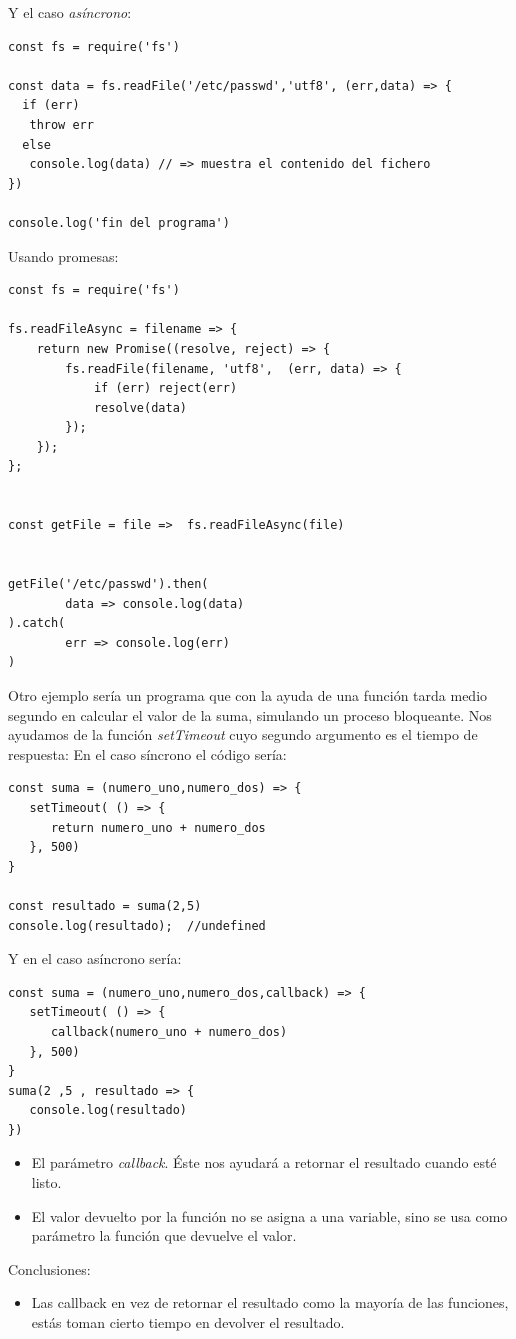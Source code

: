 \documentclass[4paper]{article}
\begin{document}
Y el caso \emph{asíncrono}:
\begin{lstlisting}
const fs = require('fs')

const data = fs.readFile('/etc/passwd','utf8', (err,data) => {
  if (err)
   throw err
  else
   console.log(data) // => muestra el contenido del fichero
})

console.log('fin del programa')
\end{lstlisting}
Usando promesas:
\begin{lstlisting}
const fs = require('fs')

fs.readFileAsync = filename => {
    return new Promise((resolve, reject) => {
        fs.readFile(filename, 'utf8',  (err, data) => {
            if (err) reject(err)
            resolve(data)
        });
    });
};


const getFile = file =>  fs.readFileAsync(file)


getFile('/etc/passwd').then(
        data => console.log(data)
).catch(
        err => console.log(err)
)

\end{lstlisting}

\newpage
Otro ejemplo sería un programa que con la ayuda de una función tarda medio segundo en calcular el valor de la suma, simulando un proceso bloqueante. Nos ayudamos de la función \emph{setTimeout} cuyo segundo argumento es el tiempo de respuesta:
En el caso síncrono el código sería:
\begin{lstlisting}
const suma = (numero_uno,numero_dos) => {
   setTimeout( () => {
      return numero_uno + numero_dos
   }, 500)
}

const resultado = suma(2,5)
console.log(resultado);  //undefined
\end{lstlisting}
Y en el caso asíncrono sería:
\begin{lstlisting}
const suma = (numero_uno,numero_dos,callback) => {
   setTimeout( () => {
      callback(numero_uno + numero_dos)
   }, 500)
}
suma(2 ,5 , resultado => {
   console.log(resultado)
})

\end{lstlisting}
\begin{itemize}
\item El parámetro \emph{callback}. Éste nos ayudará a retornar el resultado cuando esté listo.
\item El valor devuelto por la función no se asigna a una variable, sino se usa como parámetro la función que devuelve el valor.
\end{itemize}
Conclusiones:
\begin{itemize}
\item Las callback en vez de retornar el resultado como la mayoría de las funciones, estás toman cierto tiempo en devolver el resultado.
\end{itemize}
\end{document}
